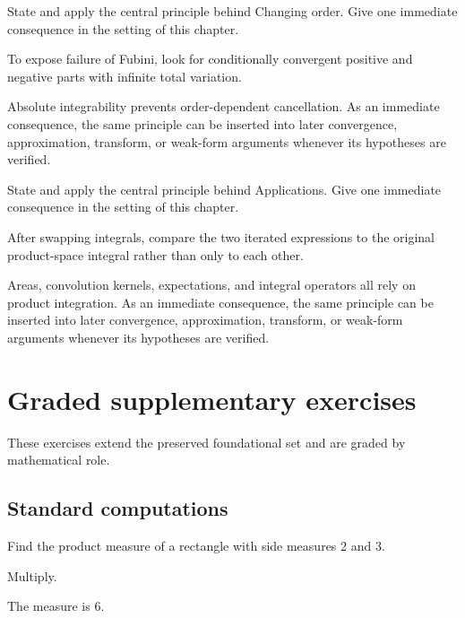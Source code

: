 \begin{exercise}\label{exr:iii05-07}
State and apply the central principle behind Changing order. Give one immediate consequence in the setting of this chapter.
\end{exercise}
\begin{hint}
To expose failure of Fubini, look for conditionally convergent positive and negative parts with infinite total variation.
\end{hint}
\begin{solution}
Absolute integrability prevents order-dependent cancellation. As an immediate consequence, the same principle can be inserted into later convergence, approximation, transform, or weak-form arguments whenever its hypotheses are verified.
\end{solution}

\begin{exercise}\label{exr:iii05-08}
State and apply the central principle behind Applications. Give one immediate consequence in the setting of this chapter.
\end{exercise}
\begin{hint}
After swapping integrals, compare the two iterated expressions to the original product-space integral rather than only to each other.
\end{hint}
\begin{solution}
Areas, convolution kernels, expectations, and integral operators all rely on product integration. As an immediate consequence, the same principle can be inserted into later convergence, approximation, transform, or weak-form arguments whenever its hypotheses are verified.
\end{solution}


\section{Graded supplementary exercises}
These exercises extend the preserved foundational set and are graded by mathematical role.

\subsection*{Standard computations}

\begin{exercise}[Rectangle]\label{exr:iii05-expand-01}
Find the product measure of a rectangle with side measures 2 and 3.
\end{exercise}
\begin{hint}
Multiply.
\end{hint}
\begin{solution}
The measure is 6.
\end{solution}

